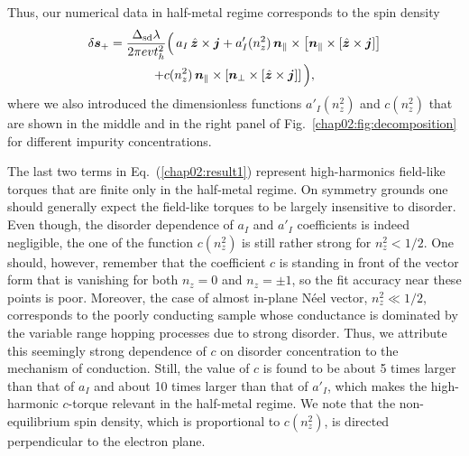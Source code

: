 Thus, our numerical data in half-metal regime corresponds to the spin density
\begin{multline}
\label{chap02:result1}
\delta\boldsymbol{s}_+= \frac{\Delta_\text{sd}\lambda}{2\pi evt_h^2}
\Big(\,a_I\,\hat{\boldsymbol{z}}\times \boldsymbol{j} + a'_I(n_z^2)\,\boldsymbol{n}_\parallel\times \left[\boldsymbol{n}_\parallel\times \left[\hat{\boldsymbol{z}}\times\boldsymbol{j}\right]\right]\\
+c(n_z^2)\,\boldsymbol{n}_\parallel\times \left[\boldsymbol{n}_\perp\times \left[\hat{\boldsymbol{z}}\times\boldsymbol{j}\right]\right]\Big),
\end{multline}
where we also introduced the dimensionless functions $a'_I(n_z^2)$ and $c(n_z^2)$ that are shown in the middle and in the right panel of Fig.~\ref{chap02:fig:decomposition} for different impurity concentrations. 

The last two terms in Eq.~(\ref{chap02:result1}) represent high-harmonics field-like torques that are finite only in the half-metal regime. On symmetry grounds one should generally expect the field-like torques to be largely insensitive to disorder. Even though, the disorder dependence of $a_I$ and $a'_I$ coefficients is indeed negligible, the one of the function $c(n_z^2)$ is still rather strong for $n_z^2<1/2$. One should, however, remember that the coefficient $c$ is standing in front of the vector form that is vanishing for both $n_z=0$ and $n_z=\pm 1$, so the fit accuracy near these points is poor. Moreover, the case of almost in-plane N\'eel vector, $n_z^2\ll 1/2$, corresponds to the poorly conducting sample whose conductance is dominated by the variable range hopping processes due to strong disorder. Thus, we attribute this seemingly strong dependence of $c$ on disorder concentration to the mechanism of conduction. Still, the value of $c$ is found to be about 5 times larger than that of $a_I$ and about 10 times larger than that of $a'_I$, which makes the high-harmonic $c$-torque relevant in the half-metal regime. We note that the non-equilibrium spin density, which is proportional to $c(n_z^2)$, is directed perpendicular to the electron plane.  

